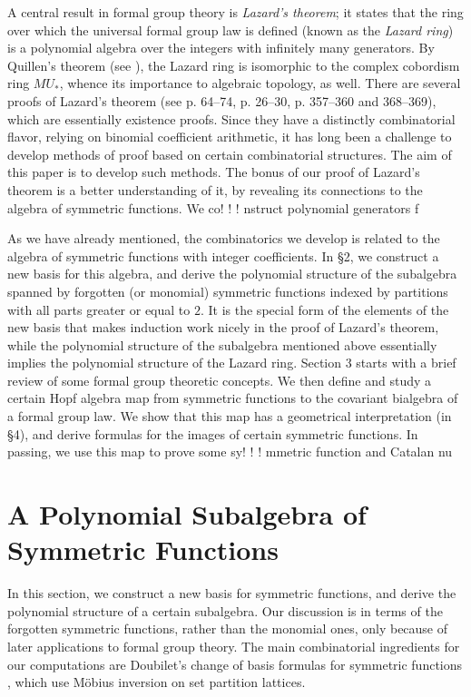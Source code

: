 \documentclass[a4paper,12pt]{amsart}
\theoremstyle{definition}
\numberwithin{equation}{section}
\begin{document}
A central result in formal group theory is {\em Lazard's theorem}; it states that the ring over which the universal formal group law is defined (known as the {\em Lazard ring}) is a polynomial algebra over the integers with infinitely many generators. By Quillen's theorem (see \cite{adashg}), the Lazard ring is isomorphic to the complex cobordism ring $MU_*$, whence its importance to algebraic topology, as well. There are several proofs of Lazard's theorem (see \cite{adashg} p. 64--74, \cite{hazfga} p. 26--30, \cite{ravccs} p. 357--360 and 368--369), which are essentially existence proofs. Since they have a distinctly combinatorial flavor, relying on binomial coefficient arithmetic, it has long been a challenge to develop methods of proof based on certain combinatorial structures. The aim of this paper is to develop such methods. The bonus of our proof of Lazard's theorem is a better understanding of it, by revealing its connections to the algebra of symmetric functions. We co!
!
!
nstruct polynomial generators f

As we have already mentioned, the combinatorics we develop is related to the algebra of symmetric functions with integer coefficients. In \S2, we construct a new basis for this algebra, and derive the polynomial structure of the subalgebra spanned by forgotten (or monomial) symmetric functions indexed by partitions with all parts greater or equal to $2$. It is the special form of the elements of the new basis that makes induction work nicely in the proof of Lazard's theorem, while the polynomial structure of the subalgebra mentioned above essentially implies the polynomial structure of the Lazard ring. Section 3 starts with a brief review of some formal group theoretic concepts. We then define and study a certain Hopf algebra map from symmetric functions to the covariant bialgebra of a formal group law. We show that this map has a geometrical interpretation (in \S4), and derive formulas for the images of certain symmetric functions. In passing, we use this map to prove some sy!
!
!
mmetric function and Catalan nu
 
\section{A Polynomial Subalgebra of Symmetric Functions}

In this section, we construct a new basis for symmetric functions, and derive the polynomial structure of a certain subalgebra. Our discussion is in terms of the forgotten symmetric functions, rather than the monomial ones, only because of later applications to formal group theory. The main combinatorial ingredients for our computations are Doubilet's change of basis formulas for symmetric functions \cite{doufct7}, which use M\"{o}bius inversion on set partition lattices. 
\end{document}
